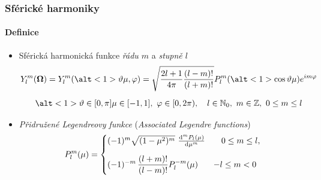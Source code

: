 \begin{frame}
  \frametitle{Sférické harmoniky}
  \framesubtitle{Definice}
  \begin{itemize}
  	\item<1-3> Sférická harmonická funkce \textcolor{structure}{\emph{řádu $m$}} a \textcolor{structure}{\emph{stupně $l$}}
  	  \begin{gather*}
        \Y{l}{m}(\bomega) = \Y{l}{m}(\alt<1>{\polar}{\mu},\azimuthal) = \sqrt{\frac{2l+1}{4\pi}\frac{(l-m)!}{(l+m)!}} \P{l}^m(
          \alt<1>{\cos\polar}{\mu}
        )e^{i m \azimuthal}\\[.5em]
        \alt<1>{\polar\in [0,\pi]}{\mu\in[-1,1]},\ \azimuthal\in [0,2\pi),\quad 
        l\in\mathbb{N}_0,\ m\in\mathbb{Z},\ 0\leq m \leq l
      \end{gather*}
    \item<3> \textcolor{structure}{\emph{Přidružené Legendreovy funkce}} (\emph{Associated Legendre functions})
    $$
      \P{l}^m(\mu) = 
      \begin{cases} 
        (-1)^m\sqrt{(1-\mu^2)^m}\ \der[m]{\P{l}(\mu)}{\mu} & \hphantom{-}\,0 \leq m \leq l,\\[1em]
        \displaystyle (-1)^{-m}\,\frac{(l+m)!}{(l-m)!}\P{l}^{-m}(\mu) & -l \leq m < 0 
      \end{cases}
    $$
  \end{itemize}
  

\end{frame}

